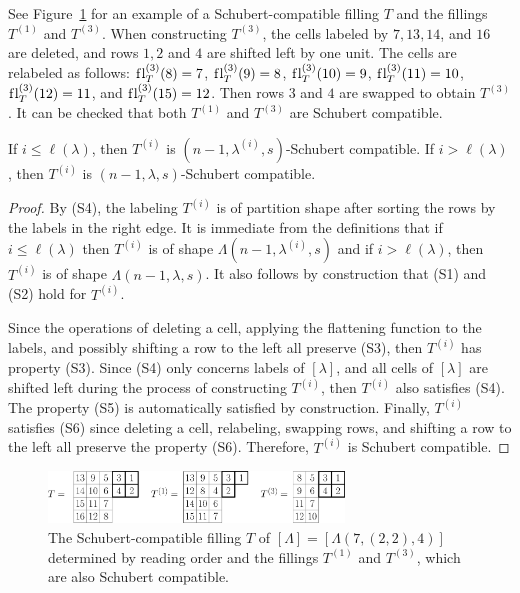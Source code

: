 \documentclass[12pt]{amsart}
\newcommand{\la}{\lambda}
\newcommand{\fl}{\mathrm{f\hspace{0.25pt}l}}
\begin{document}
See Figure~\ref{fig:ReadingOrder} for an example of a Schubert-compatible filling $T$ and the fillings $T^{(1)}$ and $T^{(3)}$. When constructing $T^{(3)}$, the cells labeled by $7,13,14$, and $16$ are deleted, and rows $1,2$ and $4$ are shifted left by one unit. The cells are relabeled as follows: $\fl_T^{(3)}(8)=7$, $\fl_T^{(3)}(9) = 8$, $\fl_T^{(3)}(10) = 9$, $\fl_T^{(3)}(11)=10$, $\fl_T^{(3)}(12) = 11$, and $\fl_T^{(3)}(15)=12$. Then rows $3$ and $4$ are swapped to obtain $T^{(3)}$. It can be checked that both $T^{(1)}$ and $T^{(3)}$ are  Schubert compatible.

\begin{lemma}
If $i \leq \ell(\lambda)$, then $T^{(i)}$ is $(n-1,\lambda^{(i)},s)$-Schubert compatible. If $i > \ell(\lambda)$, then $T^{(i)}$ is $(n-1,\lambda,s)$-Schubert compatible.
\end{lemma}

\begin{proof}
By (S4), the labeling $T^{(i)}$ is of partition shape after sorting the rows by the labels in the right edge. It is immediate from the definitions that if $i\leq \ell(\la)$ then $T^{(i)}$ is of shape $\Lambda(n-1,\la^{(i)},s)$ and if $i> \ell(\la)$, then $T^{(i)}$ is of shape $\Lambda(n-1,\la,s)$. It also follows by construction that (S1) and (S2) hold for $T^{(i)}$.

Since the operations of deleting a cell, applying the flattening function to the labels, and possibly shifting a row to the left all preserve (S3), then $T^{(i)}$ has property (S3). Since (S4) only concerns labels of $[\lambda]$, and all cells of $[\lambda]$ are shifted left during the process of constructing $T^{(i)}$, then $T^{(i)}$ also satisfies (S4). The property (S5) is automatically satisfied by construction. Finally, $T^{(i)}$ satisfies (S6) since deleting a cell, relabeling, swapping rows, and shifting a row to the left all preserve the property (S6). Therefore, $T^{(i)}$ is Schubert compatible. 
\end{proof}




\begin{figure}
    \centering
    \includegraphics[width=0.7\textwidth]{ReadingOrder.eps}
    \caption{The Schubert-compatible filling $T$ of $[\Lambda] = [\Lambda(7,(2,2),4)]$ determined by reading order and the fillings $T^{(1)}$ and $T^{(3)}$, which are also Schubert compatible.}
    \label{fig:ReadingOrder}
\end{figure}
\end{document}
